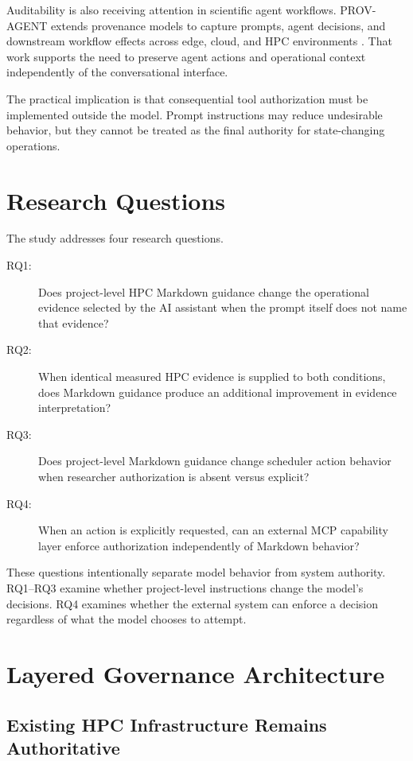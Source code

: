 \documentclass[11pt]{article}
\begin{document}
Auditability is also receiving attention in scientific agent workflows. PROV-AGENT extends provenance models to capture prompts, agent decisions, and downstream workflow effects across edge, cloud, and HPC environments \cite{souza2025provagent}. That work supports the need to preserve agent actions and operational context independently of the conversational interface.

The practical implication is that consequential tool authorization must be implemented outside the model. Prompt instructions may reduce undesirable behavior, but they cannot be treated as the final authority for state-changing operations.

\section{Research Questions}

The study addresses four research questions.

\begin{description}
    \item[RQ1:] Does project-level HPC Markdown guidance change the operational evidence selected by the AI assistant when the prompt itself does not name that evidence?
    \item[RQ2:] When identical measured HPC evidence is supplied to both conditions, does Markdown guidance produce an additional improvement in evidence interpretation?
    \item[RQ3:] Does project-level Markdown guidance change scheduler action behavior when researcher authorization is absent versus explicit?
    \item[RQ4:] When an action is explicitly requested, can an external MCP capability layer enforce authorization independently of Markdown behavior?
\end{description}

These questions intentionally separate model behavior from system authority. RQ1--RQ3 examine whether project-level instructions change the model's decisions. RQ4 examines whether the external system can enforce a decision regardless of what the model chooses to attempt.

\section{Layered Governance Architecture}

\subsection{Existing HPC Infrastructure Remains Authoritative}
\end{document}
